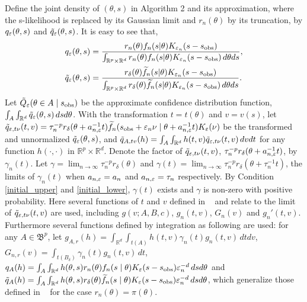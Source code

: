 \documentclass{article}
\begin{document}
\noindent Define the joint density of $(\theta,s)$ in Algorithm 2
and its approximation, where the s-likelihood is replaced by its Gaussian
limit and $r_{n}(\theta)$ by its truncation, by $q_{\varepsilon}(\theta,s)$
and $\tilde{q}_{\varepsilon}(\theta,s)$. It is easy to see that,
\begin{align*}
q_{\varepsilon}(\theta,s) & =\frac{r_{n}(\theta)f_{n}(s|\theta)K_{\varepsilon_{n}}(s-s_{\rm obs})}{\int_{\mathbb{R}^{p}\times\mathbb{R}^{d}}r_{n}(\theta)f_{n}(s|\theta)K_{\varepsilon_{n}}(s-s_{\rm obs})\,d\theta ds},\\
\tilde{q}_{\varepsilon}(\theta,s) & =\frac{r_{\delta}(\theta)\widetilde{f}_{n}(s|\theta)K_{\varepsilon_{n}}(s-s_{\rm obs})}{\int_{\mathbb{R}^{p}\times\mathbb{R}^{d}}r_{\delta}(\theta)\widetilde{f}_{n}(s|\theta)K_{\varepsilon_{n}}(s-s_{\rm obs})\,d\theta ds}.
\end{align*}
Let $\tilde{Q}_{\varepsilon}(\theta\in A\mid s_{\rm obs})$ be the approximate confidence distribution function, $\int_{A}\int_{\mathbb{R}^{d}}\tilde{q}_{\varepsilon}(\theta,s)\,dsd\theta$.
With the transformation $t=t(\theta)$ and $v=v(s)$, let $\tilde{q}_{\varepsilon,t\nu}(t,v)=\tau_{n}^{-p}r_{\delta}(\theta+a_{n,\varepsilon}^{-1}t)\widetilde{f}_{n}(s_{\rm obs}+\varepsilon_{n}\nu\mid\theta+a_{n,\varepsilon}^{-1}t)K_{\varepsilon}(\nu)$
be the transformed and unnormalized $\tilde{q}_{\varepsilon}(\theta,s)$, and
$\tilde{q}_{A,tv}(h)=\int_{A}\int_{\mathbb{R}^{d}}h(t,v)\tilde{q}_{\varepsilon,t\nu}(t,v)\,dvdt$
for any function $h(\cdot,\cdot)$ in $\mathbb{R}^{p}\times\mathbb{R}^{d}$.
Denote the factor of $\tilde{q}_{\varepsilon,t\nu}(t,v)$, $\tau_{n}^{-p}r_{\delta}(\theta+a_{n,\varepsilon}^{-1}t)$,
by $\gamma_{n}(t)$. Let $\gamma=\lim_{n\rightarrow\infty}\tau_{n}^{-p}r_{\delta}(\theta)$
and $\gamma(t)=\lim_{n\rightarrow\infty}\tau_{n}^{-p}r_{\delta}(\theta+\tau_{n}^{-1}t)$,
the limits of $\gamma_{n}(t)$ when $a_{n,\varepsilon}=a_{n}$ and
$a_{n,\varepsilon}=\tau_{n}$ respectively. By Condition \ref{initial_upper} and \ref{initial_lower},
$\gamma(t)$ exists and $\gamma$ is non-zero with positive probability.
Here several functions of $t$ and $v$ defined in ~\cite[proofs for Section 3.1]{Li2017}
and relate to the limit of $\tilde{q}_{\varepsilon,t\nu}(t,v)$ are used, including
$g(v;A,B,c)$, $g_{n}(t,v)$, $G_{n}(v)$ and $g_{n}'(t,v)$. Furthermore
several functions defined by integration as following are used: for
any $A\in\mathfrak{B}^{p}$, let $g_{A,r}(h)=\int_{\mathbb{R}^{d}}\int_{t(A)}h(t,v)\gamma_{n}(t)g_{n}(t,v)\,dtdv$,
$G_{n,r}(v)=\int_{t(B_{\delta})}\gamma_{n}(t)g_{n}(t,v)\,dt$, $q_{A}(h)=\int_{A}\int_{\mathbb{R}^{d}}h(\theta,s)r_{n}(\theta)f_{n}(s\mid\theta)K_{\varepsilon}(s-s_{\rm obs})\varepsilon_{n}^{-d}\,dsd\theta$
and $\tilde{q}_{A}(h)=\int_{A}\int_{\mathbb{R}^{d}}h(\theta,s)r_{\delta}(\theta)\widetilde{f}_{n}(s\mid\theta)K_{\varepsilon}(s-s_{\rm obs})\varepsilon_{n}^{-d}\,dsd\theta$,
which generalize those defined in ~\cite[proofs for Section 3.1]{Li2017}
for the case $r_{n}(\theta)=\pi(\theta)$. 
\end{document}

